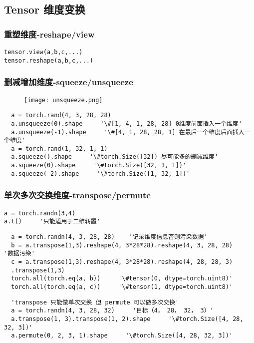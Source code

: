 \subsection{Tensor 维度变换}
\subsubsection{重塑维度-reshape/view}
\begin{lstlisting}
tensor.view(a,b,c,...)
tensor.reshape(a,b,c,...)
\end{lstlisting}

\subsubsection{删减增加维度-squeeze/unsqueeze}
\begin{figure}[!h]
  \centering
  \texttt{[image: unsqueeze.png]}
\end{figure}
\begin{lstlisting}
  a = torch.rand(4, 3, 28, 28)
  a.unsqueeze(0).shape     '\#[1, 4, 1, 28, 28] 0维度前面插入一个维度'
  a.unsqueeze(-1).shape     '\#[4, 1, 28, 28, 1] 在最后一个维度后面插入一个维度'
  a = torch.rand(1, 32, 1, 1)
  a.squeeze().shape     '\#torch.Size([32]) 尽可能多的删减维度'
  a.squeeze(0).shape     '\#torch.Size([32, 1, 1])'
  a.squeeze(-2).shape     '\#torch.Size([1, 32, 1])'
\end{lstlisting}

\subsubsection{单次多次交换维度-transpose/permute}
\begin{lstlisting}
a = torch.randn(3,4)
a.t()     '只能适用于二维转置'
\end{lstlisting}
\begin{lstlisting}
  a = torch.randn(4, 3, 28, 28)    '记录维度信息否则污染数据'
  b = a.transpose(1,3).reshape(4, 3*28*28).reshape(4, 3, 28, 28)    '数据污染'
  c = a.transpose(1,3).reshape(4, 3*28*28).reshape(4, 28, 28, 3)
  .transpose(1,3)
  torch.all(torch.eq(a, b))     '\#tensor(0, dtype=torch.uint8)'
  torch.all(torch.eq(a, c))     '\#tensor(1, dtype=torch.uint8)'
\end{lstlisting}
\begin{lstlisting}
  'transpose 只能做单次交换 但 permute 可以做多次交换'
  a = torch.randn(4, 3, 28, 32)     '目标（4， 28， 32， 3）'
  a.transpose(1, 3).transpose(1, 2).shape     '\#torch.Size([4, 28, 32, 3])'
  a.permute(0, 2, 3, 1).shape     '\#torch.Size([4, 28, 32, 3])'
\end{lstlisting}

